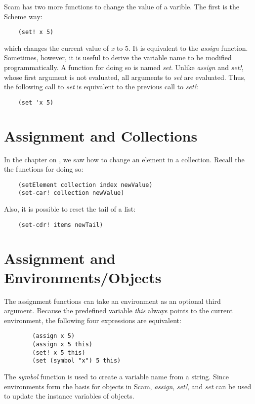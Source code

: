 Scam has two more functions to change the value of a
varible. The first is the Scheme way:

\begin{verbatim}
    (set! x 5)
\end{verbatim}

which changes the current value of {\it x} to 5.
It is equivalent to the {\it assign} function.
Sometimes, however, it is useful to derive the variable name
to be modified programmatically.
A function for doing so is named {\it set}. Unlike {\it assign} and {\it set!},
whose first argument is not evaluated, all arguments to
{\it set} are evaluated. Thus, the following call to {\it set} is
equivalent to the previous call to {\it set!}:

\begin{verbatim}
    (set 'x 5)
\end{verbatim}

\section{Assignment and Collections}

In the chapter on ,
we saw how to change an element in a collection. Recall the
the functions for doing so:

\begin{verbatim}
    (setElement collection index newValue)
    (set-car! collection newValue)
\end{verbatim}

Also, it is possible to reset the tail of a list:

\begin{verbatim}
    (set-cdr! items newTail)
\end{verbatim}

\section{Assignment and Environments/Objects}

The assignment functions can take an environment as an
optional third argument.
Because the predefined variable
{\it this} always points to the current environment,
the following
four expressions are equivalent:

\begin{verbatim}
        (assign x 5)
        (assign x 5 this)
        (set! x 5 this)
        (set (symbol "x") 5 this)
\end{verbatim}

The {\it symbol} function is used to create a variable name from
a string.
Since environments form the basis for objects in Scam,
{\it assign}, {\it set!}, and {\it set} 
can be used to update the instance variables
of objects.

